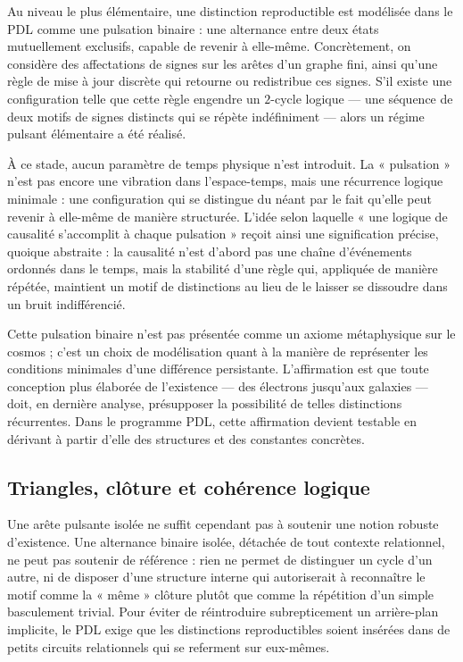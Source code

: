 \documentclass[11pt,a4paper]{article}
\theoremstyle{definition}
\begin{document}
Au niveau le plus élémentaire, une distinction reproductible est modélisée dans le PDL comme une pulsation binaire : une alternance entre deux états mutuellement exclusifs, capable de revenir à elle-même.\cite{Laubscher_IntroPDL_2024,Laubscher_Existence_PulsatingClosure_2026} Concrètement, on considère des affectations de signes sur les arêtes d’un graphe fini, ainsi qu’une règle de mise à jour discrète qui retourne ou redistribue ces signes. S’il existe une configuration telle que cette règle engendre un \(2\)-cycle logique — une séquence de deux motifs de signes distincts qui se répète indéfiniment — alors un régime pulsant élémentaire a été réalisé.

À ce stade, aucun paramètre de temps physique n’est introduit. La « pulsation » n’est pas encore une vibration dans l’espace-temps, mais une récurrence logique minimale : une configuration qui se distingue du néant par le fait qu’elle peut revenir à elle-même de manière structurée. L’idée selon laquelle « une logique de causalité s’accomplit à chaque pulsation » reçoit ainsi une signification précise, quoique abstraite : la causalité n’est d’abord pas une chaîne d’événements ordonnés dans le temps, mais la stabilité d’une règle qui, appliquée de manière répétée, maintient un motif de distinctions au lieu de le laisser se dissoudre dans un bruit indifférencié.\cite{Laubscher_Existence_PulsatingClosure_2026}

Cette pulsation binaire n’est pas présentée comme un axiome métaphysique sur le cosmos ; c’est un choix de modélisation quant à la manière de représenter les conditions minimales d’une différence persistante. L’affirmation est que toute conception plus élaborée de l’existence — des électrons jusqu’aux galaxies — doit, en dernière analyse, présupposer la possibilité de telles distinctions récurrentes. Dans le programme PDL, cette affirmation devient testable en dérivant à partir d’elle des structures et des constantes concrètes.\cite{Laubscher_EmergencePhysicalReality_2024,Laubscher_PDL_GlobalMapping_v6_2024}

\subsection{Triangles, clôture et cohérence logique}

Une arête pulsante isolée ne suffit cependant pas à soutenir une notion robuste d’existence. Une alternance binaire isolée, détachée de tout contexte relationnel, ne peut pas soutenir de référence : rien ne permet de distinguer un cycle d’un autre, ni de disposer d’une structure interne qui autoriserait à reconnaître le motif comme la « même » clôture plutôt que comme la répétition d’un simple basculement trivial.\cite{Laubscher_Existence_PulsatingClosure_2026} Pour éviter de réintroduire subrepticement un arrière-plan implicite, le PDL exige que les distinctions reproductibles soient insérées dans de petits circuits relationnels qui se referment sur eux-mêmes.
\end{document}
